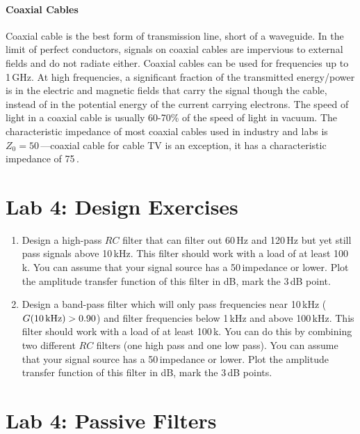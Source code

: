 \documentclass{article}
\begin{document}
\paragraph{Coaxial Cables}
Coaxial cable is the best form of transmission line, short of a waveguide. In the limit of perfect conductors, signals on coaxial cables are impervious to external fields and do not radiate either. Coaxial cables can be used for frequencies up to 1\,GHz. At high frequencies, a significant fraction of the transmitted energy/power is in the electric and magnetic fields that carry the signal though the cable, instead of in the potential energy of the current carrying electrons. The speed of light in a coaxial cable is usually 60-70\% of the speed of light in vacuum. The characteristic impedance of most coaxial cables used in industry and labs is $Z_0 = 50$\,\Ohm---coaxial cable for cable TV is an exception, it has a characteristic impedance of 75\,\Ohm.


\pagebreak

\section{Lab 4: Design Exercises}
\begin{enumerate}
\item Design a high-pass $RC$ filter that can filter out 60\,Hz and 120\,Hz but yet still pass signals above 10\,kHz. This filter should work with a load of at least 100\,k\Ohm. You can assume that your signal source has a 50\,\Ohm impedance or lower. Plot the amplitude transfer function of this filter in dB, mark the 3\,dB point.

\item Design a band-pass filter which will only pass frequencies near 10\,kHz ($G(10\,\hbox{kHz}) > 0.90$) and filter frequencies below 1\,kHz and above 100\,kHz. This filter should work with a load of at least 100\,k\Ohm. You can do this by combining two different $RC$ filters (one high pass and one low pass). You can assume that your signal source has a 50\,\Ohm impedance or lower. Plot the amplitude transfer function of this filter in dB, mark the 3\,dB points.
\end{enumerate}

\section{Lab 4: Passive Filters}
\end{document}

